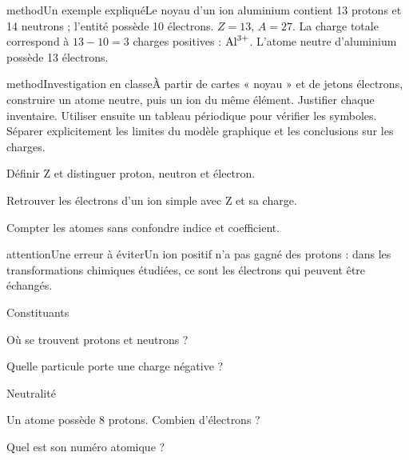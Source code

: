 \begin{pcEncadre}{method}{Un exemple expliqué}Le noyau d’un ion aluminium contient 13 protons et 14 neutrons ; l’entité possède 10 électrons. $Z=13$, $A=27$. La charge totale correspond à $13-10=3$ charges positives : $\ce{Al^{3+}}$. L’atome neutre d’aluminium possède 13 électrons.\end{pcEncadre}
\label{activite-2}
\begin{pcEncadre}{method}{Investigation en classe}À partir de cartes « noyau » et de jetons électrons, construire un atome neutre, puis un ion du même élément. Justifier chaque inventaire. Utiliser ensuite un tableau périodique pour vérifier les symboles. Séparer explicitement les limites du modèle graphique et les conclusions sur les charges.\end{pcEncadre}
\begin{questions}
\item Définir Z et distinguer proton, neutron et électron.
\item Retrouver les électrons d’un ion simple avec Z et sa charge.
\item Compter les atomes sans confondre indice et coefficient.
\end{questions}
\begin{pcEncadre}{attention}{Une erreur à éviter}Un ion positif n’a pas gagné des protons : dans les transformations chimiques étudiées, ce sont les électrons qui peuvent être échangés.\end{pcEncadre}
\pcGrille
\clearpage{}
\par\noindent\begin{minipage}{\linewidth}
\begin{exercice}[1]{Constituants}
\begin{questions}
\item Où se trouvent protons et neutrons ?
\item Quelle particule porte une charge négative ?
\end{questions}
\end{exercice}
\end{minipage}
\par\noindent\begin{minipage}{\linewidth}
\begin{exercice}[1]{Neutralité}
\begin{questions}
\item Un atome possède 8 protons. Combien d’électrons ?
\item Quel est son numéro atomique ?
\end{questions}
\end{exercice}
\end{minipage}
